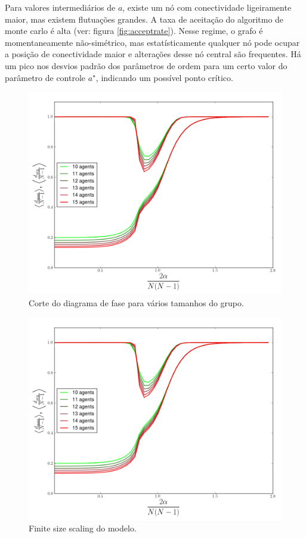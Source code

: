 Para valores intermediários de $a$, existe um nó com conectividade ligeiramente maior, mas existem flutuações grandes. A taxa de aceitação do algoritmo de monte carlo é alta (ver: figura \ref{fig:acceptrate}). Nesse regime, o grafo é momentaneamente não-simétrico, mas estatísticamente qualquer nó pode ocupar a posição de conectividade maior e alterações desse nó central são frequentes. Há um pico nos desvios padrão dos parâmetros de ordem para um certo valor do parâmetro de controle $a^{\star}$, indicando um possível ponto crítico. 
\begin{figure}
  \includegraphics[width = \textwidth]{./figuras/manysizes.png}
  \caption[Corte do diagrama de fase para vários tamanhos do grupo.]{Corte do diagrama de fase para vários tamanhos do grupo.}
  \label{fig:corte}
\end{figure}
\begin{figure}
  \includegraphics[width = \textwidth]{./figuras/manysizes.png}
  \caption{Finite size scaling do modelo.}
  \label{fig:finitess}
\end{figure}

